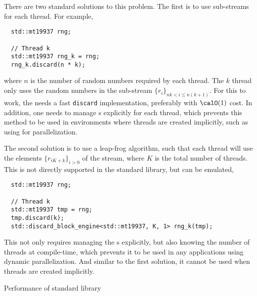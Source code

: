 There are two standard solutions to this problem. The first is to use
sub-streams for each thread. For example,
\begin{Verbatim}
  std::mt19937 rng;

  // Thread k
  std::mt19937 rng_k = rng;
  rng_k.discard(n * k);
\end{Verbatim}
where $n$ is the number of random numbers required by each thread. The $k$\ith
thread only uses the random numbers in the sub-stream $\{r_i\}_{nk < i \le
  n(k+1)}$. For this to work, the \rng needs a fast \verb|discard|
implementation, preferably with $\calO(1)$ cost. In addition, one needs to
manage \rng{}s explicitly for each thread, which prevents this method to be
used in environments where threads are created implicitly, such as using \tbb
for parallelization.

The second solution is to use a leap-frog algorithm, such that each thread will
use the elements $\{r_{iK + k}\}_{i>0}$ of the stream, where $K$ is the total
number of threads. This is not directly supported in the standard library, but
can be emulated,
\begin{Verbatim}
  std::mt19937 rng;

  // Thread k
  std::mt19937 tmp = rng;
  tmp.discard(k);
  std::discard_block_engine<std::mt19937, K, 1> rng_k(tmp);
\end{Verbatim}
This not only requires managing the \rng{}s explicitly, but also knowing the
number of threads at compile-time, which prevents it to be used in any
applications using dynamic parallelization. And similar to the first solution,
it cannot be used when threads are created implicitly.

\begin{table}
  \caption{Performance of standard library \protect\rng}
  \label{tab:Performance of standard library RNG}
\end{table}


